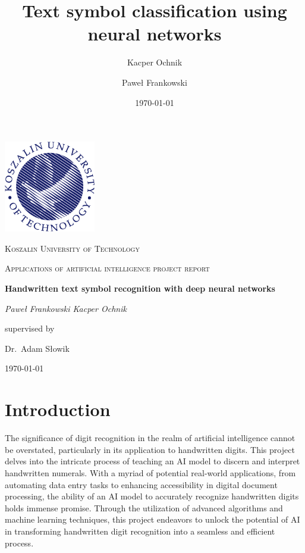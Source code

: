 \documentclass{article}
\begin{document}
\title{Text symbol classification using neural networks}
\author{Kacper Ochnik \and Paweł Frankowski}
\date{\today}

\begin{titlepage}
	\centering
	\includegraphics[width=0.3\textwidth]{images/Logo_PK_kolor_EN_PNG.png}\par\vspace{1cm}
	{\textsc{Koszalin University of Technology} \par}
	\vspace{1cm}
	{\Large \textsc{Applications of artificial intelligence project report}\par}
	\vspace{1.5cm}
	{\huge\bfseries Handwritten text symbol recognition with deep neural networks
	\par}
	\vspace{2cm}
	{\Large\itshape {Paweł Frankowski \space Kacper Ochnik}\par}
	\vfill
	supervised by\par
	Dr.~Adam Słowik

	\vfill

	{\large \today\par}
\end{titlepage}

\tableofcontents
\newpage

\section{Introduction}
The significance of digit recognition in the realm of artificial intelligence cannot be overstated, particularly in its application to handwritten digits. This project delves into the intricate process of teaching an AI model to discern and interpret handwritten numerals. With a myriad of potential real-world applications, from automating data entry tasks to enhancing accessibility in digital document processing, the ability of an AI model to accurately recognize handwritten digits holds immense promise. Through the utilization of advanced algorithms and machine learning techniques, this project endeavors to unlock the potential of AI in transforming handwritten digit recognition into a seamless and efficient process.
\end{document}
